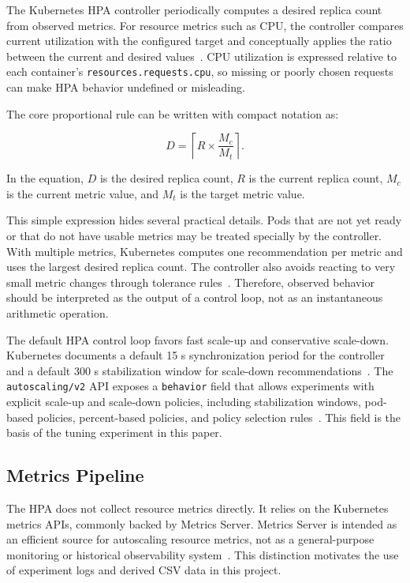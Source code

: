 \documentclass[conference]{IEEEtran}
\begin{document}
The Kubernetes HPA controller periodically computes a desired replica count from observed metrics. For resource metrics such as CPU, the controller compares current utilization with the configured target and conceptually applies the ratio between the current and desired values~\cite{kubernetes_hpa_concepts}. CPU utilization is expressed relative to each container's \texttt{resources.requests.cpu}, so missing or poorly chosen requests can make HPA behavior undefined or misleading.

The core proportional rule can be written with compact notation as:

\begin{equation}
D = \left\lceil R \times \frac{M_c}{M_t} \right\rceil .
\end{equation}

In the equation, \(D\) is the desired replica count, \(R\) is the current replica count, \(M_c\) is the current metric value, and \(M_t\) is the target metric value.

This simple expression hides several practical details. Pods that are not yet ready or that do not have usable metrics may be treated specially by the controller. With multiple metrics, Kubernetes computes one recommendation per metric and uses the largest desired replica count. The controller also avoids reacting to very small metric changes through tolerance rules~\cite{kubernetes_hpa_concepts}. Therefore, observed behavior should be interpreted as the output of a control loop, not as an instantaneous arithmetic operation.

The default HPA control loop favors fast scale-up and conservative scale-down. Kubernetes documents a default 15 s synchronization period for the controller and a default 300 s stabilization window for scale-down recommendations~\cite{kubernetes_hpa_concepts}. The \texttt{autoscaling/v2} API exposes a \texttt{behavior} field that allows experiments with explicit scale-up and scale-down policies, including stabilization windows, pod-based policies, percent-based policies, and policy selection rules~\cite{kubernetes_hpa_api_v2}. This field is the basis of the tuning experiment in this paper.

\subsection{Metrics Pipeline}

The HPA does not collect resource metrics directly. It relies on the Kubernetes metrics APIs, commonly backed by Metrics Server. Metrics Server is intended as an efficient source for autoscaling resource metrics, not as a general-purpose monitoring or historical observability system~\cite{kubernetes_metrics_server}. This distinction motivates the use of experiment logs and derived CSV data in this project.
\end{document}
